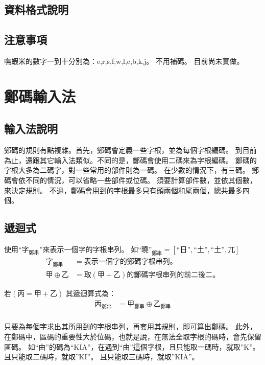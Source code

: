\documentclass{article}
\begin{document}
\subsection{資料格式說明}
\subsection{注意事項}
嘸蝦米的數字一到十分別為：e,r,s,f,w,l,c,b,k,j。
不用補碼。
目前尚未實做。

\section{鄭碼輸入法}
\subsection{輸入法說明}
鄭碼的規則有點複雜。首先，鄭碼會定義一些字根，並為每個字根編碼。
到目前為止，還跟其它輸入法類似。不同的是，鄭碼會使用二碼來為字根編碼。
鄭碼的字根大多為二碼字，對一些常用的部件則為一碼。
在少數的情況下，有三碼。
鄭碼會依不同的情況，可以省略一些部件或位碼。
須要計算部件數，並依其個數，來決定規則。
不過，鄭碼會用到的字根最多只有頭兩個和尾兩個，總共最多四個。

\subsection{遞迴式}
使用``$\mbox{字}_{\mbox{鄭串}}$''來表示一個字的字根串列。
如$\mbox{``曉''}_{\mbox{鄭串}}=[\mbox{``日''}, \mbox{``土''}, \mbox{``土''}, \mbox{兀}]$\\

\begin{subequations}
  \begin{align}
    \mbox{字}_{\mbox{鄭串}} &= 表示一個字的鄭碼字根串列。\\
    甲 \oplus 乙 &= 取(甲+乙)的鄭碼字根串列的前二後二。
  \end{align}
\end{subequations}

若$(\mbox{丙}=\mbox{甲}+\mbox{乙})$
其遞迴算式為：
\begin{subequations}
  \begin{align}
  \mbox{丙}_{\mbox{鄭串}} &= \mbox{甲}_{\mbox{鄭串}} \oplus \mbox{乙}_{\mbox{鄭串}} \\
  \end{align}
\end{subequations}

只要為每個字求出其所用到的字根串列，再套用其規則，即可算出鄭碼。
此外，在鄭碼中，區碼的重要性大於位碼，也就是說，在無法全取字根的碼時，會先保留區碼。
如``由''的碼為``KIA''，在遇到``由''這個字根，且只能取一碼時，就取''K''。
且只能取二碼時，就取''KI''。
且只能取三碼時，就取''KIA''。
\end{document}
